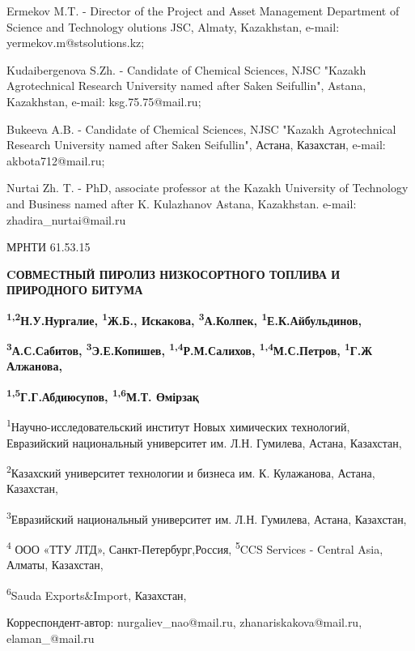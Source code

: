 Ermekov M.T. - Director of the Project and Asset Management Department
of Science and Technology olutions JSC, Almaty, Kazakhstan, e-mail:
yermekov.m@stsolutions.kz;

Kudaibergenova S.Zh. - Candidate of Chemical Sciences, NJSC "Kazakh
Agrotechnical Research University named after Saken Seifullin", Astana,
Kazakhstan, e-mail: ksg.75.75@mail.ru;

Bukeeva A.B. - Candidate of Chemical Sciences, NJSC "Kazakh
Agrotechnical Research University named after Saken Seifullin", Астана,
Казахстан, e-mail: akbota712@mail.ru;

Nurtai Zh. T. - PhD, associate professor at the Kazakh University of
Technology and Business named after K. Kulazhanov Astana, Kazakhstan.
e-mail: zhadira\_nurtai@mail.ru

МРНТИ 61.53.15

\textbf{CОВМЕСТНЫЙ ПИРОЛИЗ НИЗКОСОРТНОГО ТОПЛИВА И ПРИРОДНОГО БИТУМА}

\textbf{\textsuperscript{1,2}Н.У.Нургалие, \textsuperscript{1}Ж.Б.,
Искакова, \textsuperscript{3}А.Колпек,
\textsuperscript{1}Е.К.Айбульдинов,}

\textbf{\textsuperscript{3}А.С.Сабитов, \textsuperscript{3}Э.Е.Копишев,
\textsuperscript{1,4}Р.М.Салихов, \textsuperscript{1,4}М.С.Петров,
\textsuperscript{1}Г.Ж Алжанова,}

\textbf{\textsuperscript{1,5}Г.Г.Абдиюсупов, \textsuperscript{1,6}М.Т.
Өмірзақ}

\textsuperscript{1}Научно-исследовательский институт Новых химических
технологий, Евразийский национальный университет им. Л.Н. Гумилева,
Астана, Казахстан,

\textsuperscript{2}Казахский университет технологии и бизнеса им. К.
Кулажанова, Астана, Казахстан,

\textsuperscript{3}Евразийский национальный университет им. Л.Н.
Гумилева, Астана, Казахстан,

\textsuperscript{4} ООО «ТТУ ЛТД», Санкт-Петербург,Россия,
\textsuperscript{5}CCS Services - Central Asia, Алматы, Казахстан,

\textsuperscript{6}Sauda Exports\&Import, Казахстан,

Корреспондент-автор: nurgaliev\_nao@mail.ru, zhanariskakova@mail.ru,
elaman\_@mail.ru

